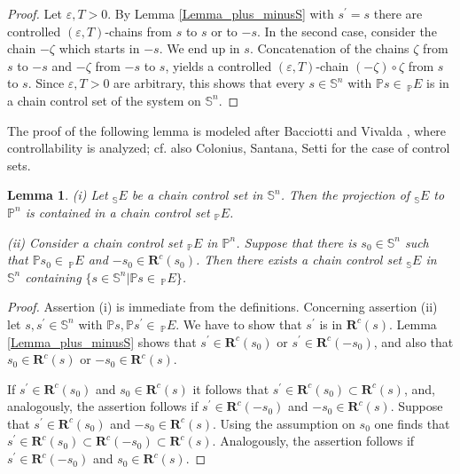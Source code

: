 \documentclass[preprint,12pt]{elsarticle}
\newtheorem{lemma}{Lemma}
\begin{document}
\begin{proof}
Let $\varepsilon,T>0$. By Lemma \ref{Lemma_plus_minusS} with $s^{\prime}=s$
there are controlled $(\varepsilon,T)$-chains from $s$ to $s$ or to $-s$. In
the second case, consider the chain $-\zeta$ which starts in $-s$. We end up
in $s$. Concatenation of the chains $\zeta$ from $s$ to $-s$ and $-\zeta$ from
$-s$ to $s$, yields a controlled $(\varepsilon,T)$-chain $\left(
-\zeta\right)  \circ\zeta$ from $s$ to $s$. Since $\varepsilon,T>0$ are
arbitrary, this shows that every $s\in\mathbb{S}^{n}$ with $\mathbb{P}%
s\in\,_{\mathbb{P}}E$ is in a chain control set of the system on
$\mathbb{S}^{n}$.
\end{proof}

The proof of the following lemma is modeled after Bacciotti and Vivalda
\cite[Lemma 3]{BacV13}, where controllability is analyzed; cf. also Colonius,
Santana, Setti \cite[Lemma 3.10]{ColSS22} for the case of control sets.

\begin{lemma}
\label{Lemma_sphere1}(i) Let $_{\mathbb{S}}E$ be a chain control set in
$\mathbb{S}^{n}$. Then the projection of $_{\mathbb{S}}E$ to $\mathbb{P}^{n}$
is contained in a chain control set $_{\mathbb{P}}E$.

(ii) Consider a chain control set $_{\mathbb{P}}E$ in $\mathbb{P}^{n}$.
Suppose that there is $s_{0}\in\mathbb{S}^{n}$ such that $\mathbb{P}s_{0}%
\in\,_{\mathbb{P}}E$ and $-s_{0}\in\mathbf{R}^{c}(s_{0})$. Then there exists a
chain control set $_{\mathbb{S}}E$ in $\mathbb{S}^{n}$ containing
$\{s\in\mathbb{S}^{n}\left\vert \mathbb{P}s\in\,_{\mathbb{P}}E\right.  \}$.
\end{lemma}

\begin{proof}
Assertion (i) is immediate from the definitions. Concerning assertion (ii) let
$s,s^{\prime}\in\mathbb{S}^{n}$ with $\mathbb{P}s,\mathbb{P}s^{\prime}%
\in\,_{\mathbb{P}}E$. We have to show that $s^{\prime}$ is in $\mathbf{R}%
^{c}(s)$. Lemma \ref{Lemma_plus_minusS} shows that $s^{\prime}\in
\mathbf{R}^{c}(s_{0})$ or $s^{\prime}\in\mathbf{R}^{c}(-s_{0})$, and also that
$s_{0}\in\mathbf{R}^{c}(s)$ or $-s_{0}\in\mathbf{R}^{c}(s)$.

If $s^{\prime}\in\mathbf{R}^{c}(s_{0})$ and $s_{0}\in\mathbf{R}^{c}(s)$ it
follows that $s^{\prime}\in\mathbf{R}^{c}(s_{0})\subset\mathbf{R}^{c}(s)$,
and, analogously, the assertion follows if $s^{\prime}\in\mathbf{R}^{c}%
(-s_{0})$ and $-s_{0}\in\mathbf{R}^{c}(s)$. Suppose that $s^{\prime}%
\in\mathbf{R}^{c}(s_{0})$ and $-s_{0}\in\mathbf{R}^{c}(s)$. Using the
assumption on $s_{0}$ one finds that $s^{\prime}\in\mathbf{R}^{c}%
(s_{0})\subset\mathbf{R}^{c}(-s_{0})\subset\mathbf{R}^{c}(s)$. Analogously,
the assertion follows if $s^{\prime}\in\mathbf{R}^{c}(-s_{0})$ and $s_{0}%
\in\mathbf{R}^{c}(s)$.
\end{proof}
\end{document}
